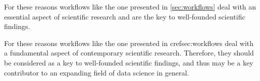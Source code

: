 For these reasons workflows like the one presented in \cref{sec:workflows} deal with an essential aspect of scientific research and are the key to well-founded scientific findings.

For these reasons workflows like the one presented in cref{sec:workflows} deal with a fundamental aspect of contemporary scientific research.  Therefore, they should be considered as a key to well-founded scientific findings, and thus may be a key contributor to an expanding field of data science in general.
